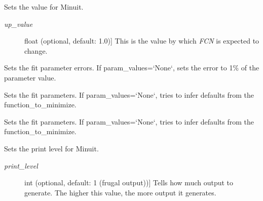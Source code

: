 \documentclass[a4paper,10pt,english]{sphinxmanual}
\begin{document}
\begin{fulllineitems}

\begin{fulllineitems}
\label{index:kafe.minuit.Minuit.set_err}
Sets the  value for Minuit.
\begin{description}
\item[{\emph{up\_value}}] \leavevmode{[}float (optional, default: 1.0){]}
This is the value by which \emph{FCN} is expected to change.

\end{description}

\end{fulllineitems}


\begin{fulllineitems}
\label{index:kafe.minuit.Minuit.set_parameter_errors}
Sets the fit parameter errors. If param\_values={}`None{}`, sets the error to 1\% of the parameter value.

\end{fulllineitems}


\begin{fulllineitems}
\label{index:kafe.minuit.Minuit.set_parameter_names}
Sets the fit parameters. If param\_values={}`None{}`, tries to infer defaults from the function\_to\_minimize.

\end{fulllineitems}


\begin{fulllineitems}
\label{index:kafe.minuit.Minuit.set_parameter_values}
Sets the fit parameters. If param\_values={}`None{}`, tries to infer defaults from the function\_to\_minimize.

\end{fulllineitems}


\begin{fulllineitems}
\label{index:kafe.minuit.Minuit.set_print_level}
Sets the print level for Minuit.
\begin{description}
\item[{\emph{print\_level}}] \leavevmode{[}int (optional, default: 1 (frugal output)){]}
Tells  how much output to generate. The higher this value, the
more output it generates.


\end{description}
\end{fulllineitems}
\end{fulllineitems}
\end{document}
